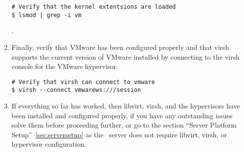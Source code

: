 \begin{enumerate}
\begin{lstlisting}
# Verify that the kernel extentsions are loaded
$ lsmod | grep -i vm
\end{lstlisting}

.\item      Finally, verify that VMware has been configured properly and that virsh supports the current version of VMware 
                installed by connecting to the virsh console for the VMware hypervisor.

\lstset{language=bash,caption=Verify VMware Works with Virsh}
\begin{lstlisting}
# Verify that virsh can connect to vmware
$ virsh --connect vmwarews:///session
\end{lstlisting}

\item	If everything so far has worked, then libvirt, virsh, and the hypervisors have been installed and configured properly,
			if you have any outstanding issues solve them before proceeding further, or go to the section ``Server Platform 		
			Setup''~\ref{sec:serversetup} as the \tapper~server does not require libvirt, virsh, or hypervisor configuration.
		
\end{enumerate}




